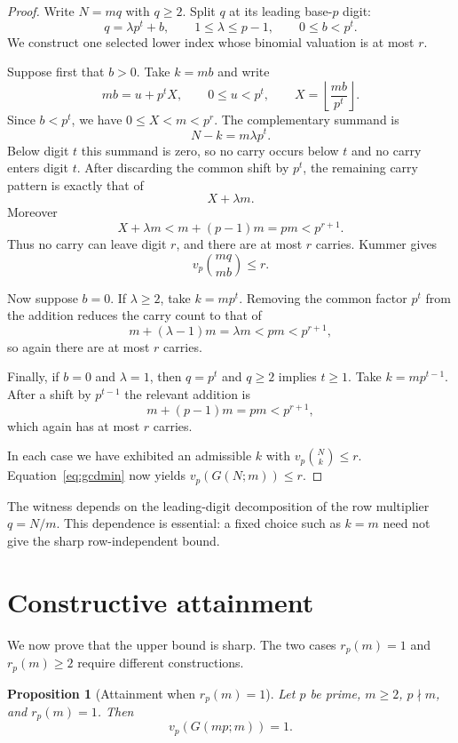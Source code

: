 \documentclass[11pt]{article}
\newtheorem{proposition}[theorem]{Proposition}
\theoremstyle{definition}
\theoremstyle{remark}
\begin{document}
\begin{proof}
Write $N=mq$ with $q\ge2$. Split $q$ at its leading base-$p$ digit:
\[
  q=\lambda p^t+b,
  \qquad 1\le\lambda\le p-1,
  \qquad 0\le b<p^t.
\]
We construct one selected lower index whose binomial valuation is at most $r$.

Suppose first that $b>0$. Take $k=mb$ and write
\[
  mb=u+p^tX,
  \qquad 0\le u<p^t,
  \qquad X=\left\lfloor\frac{mb}{p^t}\right\rfloor.
\]
Since $b<p^t$, we have $0\le X<m<p^r$. The complementary summand is
\[
  N-k=m\lambda p^t.
\]
Below digit $t$ this summand is zero, so no carry occurs below $t$ and no carry enters digit $t$. After discarding the common shift by $p^t$, the remaining carry pattern is exactly that of
\[
  X+\lambda m.
\]
Moreover
\[
  X+\lambda m<m+(p-1)m=pm<p^{r+1}.
\]
Thus no carry can leave digit $r$, and there are at most $r$ carries. Kummer gives
\[
  v_p\binom{mq}{mb}\le r.
\]

Now suppose $b=0$. If $\lambda\ge2$, take $k=mp^t$. Removing the common factor $p^t$ from the addition reduces the carry count to that of
\[
  m+(\lambda-1)m=\lambda m<pm<p^{r+1},
\]
so again there are at most $r$ carries.

Finally, if $b=0$ and $\lambda=1$, then $q=p^t$ and $q\ge2$ implies $t\ge1$. Take $k=mp^{t-1}$. After a shift by $p^{t-1}$ the relevant addition is
\[
  m+(p-1)m=pm<p^{r+1},
\]
which again has at most $r$ carries.

In each case we have exhibited an admissible $k$ with $v_p\binom Nk\le r$. Equation~\eqref{eq:gcdmin} now yields $v_p(G(N;m))\le r$.
\end{proof}

The witness depends on the leading-digit decomposition of the row multiplier $q=N/m$. This dependence is essential: a fixed choice such as $k=m$ need not give the sharp row-independent bound.

\section{Constructive attainment}\label{sec:attainA}

We now prove that the upper bound is sharp. The two cases $r_p(m)=1$ and $r_p(m)\ge2$ require different constructions.

\begin{proposition}[Attainment when $r_p(m)=1$]\label{prop:r1}
Let $p$ be prime, $m\ge2$, $p\nmid m$, and $r_p(m)=1$. Then
\[
  v_p(G(mp;m))=1.
\]
\end{proposition}
\end{document}
